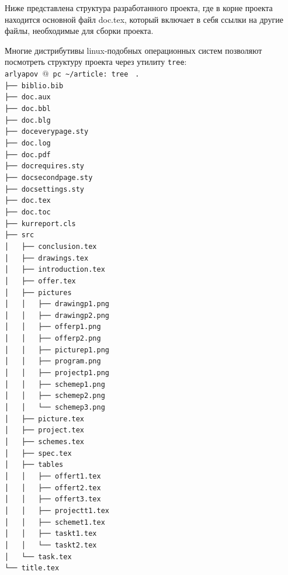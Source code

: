 			Ниже представлена структура разработанного проекта, где в корне проекта находится основной файл doc.tex, который включает в себя
			ссылки на другие файлы, необходимые для сборки проекта.

			Многие дистрибутивы linux-подобных операционных систем позволяют посмотреть структуру проекта через утилиту \texttt{tree}: \\
			\texttt{\footnotesize arlyapov\ $@$ pc \sim/article: tree}
			\newpage
			\texttt{\footnotesize 
				.\\
				├── biblio.bib\\
				├── doc.aux\\
				├── doc.bbl\\
				├── doc.blg\\
				├── doceverypage.sty\\
				├── doc.log\\
				├── doc.pdf\\
				├── docrequires.sty\\
				├── docsecondpage.sty\\
				├── docsettings.sty\\
				├── doc.tex\\
				├── doc.toc\\
				├── kurreport.cls\\
				├── src\\
				│~~~├── conclusion.tex\\
				│~~~├── drawings.tex\\
				│~~~├── introduction.tex\\
				│~~~├── offer.tex\\
				│~~~├── pictures\\
				│~~~│~~~├── drawingp1.png\\
				│~~~│~~~├── drawingp2.png\\
				│~~~│~~~├── offerp1.png\\
				│~~~│~~~├── offerp2.png\\
				│~~~│~~~├── picturep1.png\\
				│~~~│~~~├── program.png\\
				│~~~│~~~├── projectp1.png\\
				│~~~│~~~├── schemep1.png\\
				│~~~│~~~├── schemep2.png\\
				│~~~│~~~└── schemep3.png\\
				│~~~├── picture.tex\\
				│~~~├── project.tex\\
				│~~~├── schemes.tex\\
				│~~~├── spec.tex\\
				│~~~├── tables\\
				│~~~│~~~├── offert1.tex\\
				│~~~│~~~├── offert2.tex\\
				│~~~│~~~├── offert3.tex\\
				│~~~│~~~├── projectt1.tex\\
				│~~~│~~~├── schemet1.tex\\
				│~~~│~~~├── taskt1.tex\\
				│~~~│~~~└── taskt2.tex\\
				│~~~└── task.tex\\
				└── title.tex 
			}

